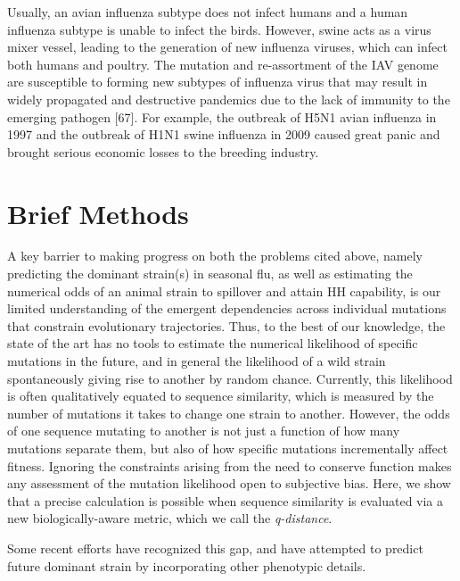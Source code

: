 \documentclass[onecolumn, compsoc,10pt]{IEEEtran}
\begin{document}
{  Usually, an avian influenza subtype does not infect humans and a human influenza subtype is unable to infect the birds. However, swine acts as a virus mixer vessel, leading to the generation of new influenza viruses, which can infect both humans and poultry. The mutation and re-assortment of the IAV genome are susceptible to forming new subtypes of influenza virus that may result in widely propagated and destructive pandemics due to the lack of immunity to the emerging pathogen [67]. For example, the outbreak of H5N1 avian influenza in 1997 and the outbreak of H1N1 swine influenza in 2009 caused great panic and brought serious economic losses to the breeding industry.



}


\section*{Brief Methods}
A key barrier to making progress  on both the problems cited above, namely predicting the dominant strain(s) in seasonal flu, as well as estimating the numerical odds of an animal strain  to spillover and attain HH capability,  is our limited understanding of the emergent dependencies across individual mutations that  constrain evolutionary trajectories. Thus, to the best of our knowledge, the state of the art has no tools to estimate the numerical likelihood of specific mutations in the future, and in general  the likelihood of a wild strain spontaneously giving rise to another by random chance. Currently, this likelihood is often qualitatively equated to sequence similarity, which is measured by the number of mutations it takes to change one strain to another. However, the odds of one sequence mutating to another is not just a function of how many mutations separate them, but also of how specific mutations incrementally affect fitness. Ignoring the constraints arising from the need to conserve function makes any assessment of the mutation likelihood open to subjective bias. Here, we show that a precise calculation is possible when sequence similarity is evaluated via a new biologically-aware metric, which we call the \textit{q-distance}.

Some recent efforts have recognized this gap, and have attempted to predict future dominant strain by incorporating other phenotypic details. 
\end{document}
